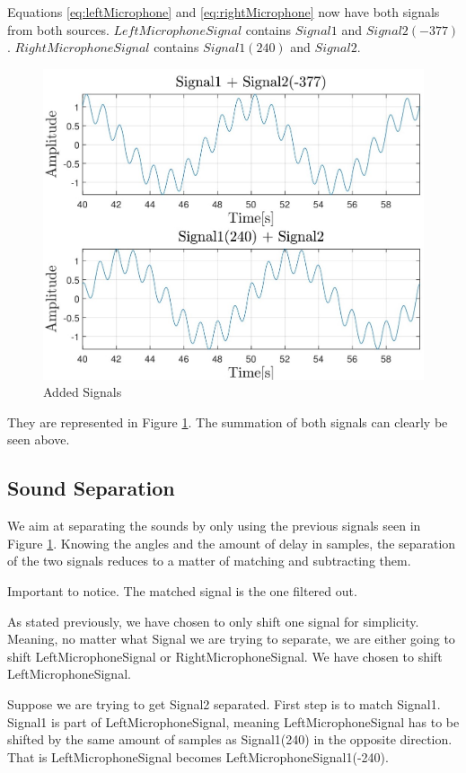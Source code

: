 Equations \ref{eq:leftMicrophone} and \ref{eq:rightMicrophone} now have both signals from both sources.
\newpage
$LeftMicrophoneSignal$ contains $Signal1$ and $Signal2(-377)$. $RightMicrophoneSignal$ contains 
$Signal1(240)$ and $Signal2$.
\begin{figure}[htp]
	\centering
	\includegraphics[width=\textwidth]{Illustrations/source1And2.jpg}
	\caption{Added Signals}
	\label{fig:source1And2}
\end{figure}

They are represented in Figure \ref{fig:source1And2}. The summation of both signals can clearly 
be seen above.
\newpage
\subsection*{Sound Separation}
We aim at separating the sounds by only using the previous signals seen in Figure \ref{fig:source1And2}.
Knowing the angles and the amount of delay in samples, the separation of the two signals reduces to
a matter of matching and subtracting them. 

Important to notice. The matched signal is the one filtered out.

As stated previously, we have chosen to only shift one signal for simplicity. Meaning, no matter
what Signal we are trying to separate, we are either going to shift LeftMicrophoneSignal or 
RightMicrophoneSignal. We have chosen to shift LeftMicrophoneSignal.

Suppose we are trying to get Signal2 separated.
First step is to match Signal1. Signal1 is part of LeftMicrophoneSignal, meaning LeftMicrophoneSignal
has to be shifted by the same amount of samples as Signal1(240) in the opposite direction. That is 
LeftMicrophoneSignal becomes LeftMicrophoneSignal1(-240).

